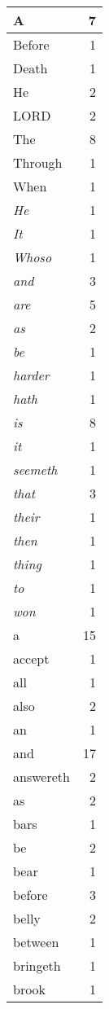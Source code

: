 \begin{center}
\begin{longtable}{l|r}
A & 7\\ \hline 
Before & 1\\ \hline 
Death & 1\\ \hline 
He & 2\\ \hline 
LORD & 2\\ \hline 
The & 8\\ \hline 
Through & 1\\ \hline 
When & 1\\ \hline 
\emph{He} & 1\\ \hline 
\emph{It} & 1\\ \hline 
\emph{Whoso} & 1\\ \hline 
\emph{and} & 3\\ \hline 
\emph{are} & 5\\ \hline 
\emph{as} & 2\\ \hline 
\emph{be} & 1\\ \hline 
\emph{harder} & 1\\ \hline 
\emph{hath} & 1\\ \hline 
\emph{is} & 8\\ \hline 
\emph{it} & 1\\ \hline 
\emph{seemeth} & 1\\ \hline 
\emph{that} & 3\\ \hline 
\emph{their} & 1\\ \hline 
\emph{then} & 1\\ \hline 
\emph{thing} & 1\\ \hline 
\emph{to} & 1\\ \hline 
\emph{won} & 1\\ \hline 
a & 15\\ \hline 
accept & 1\\ \hline 
all & 1\\ \hline 
also & 2\\ \hline 
an & 1\\ \hline 
and & 17\\ \hline 
answereth & 2\\ \hline 
as & 2\\ \hline 
bars & 1\\ \hline 
be & 2\\ \hline 
bear & 1\\ \hline 
before & 3\\ \hline 
belly & 2\\ \hline 
between & 1\\ \hline 
bringeth & 1\\ \hline 
brook & 1\\ \hline 

\end{longtable}
\end{center}

